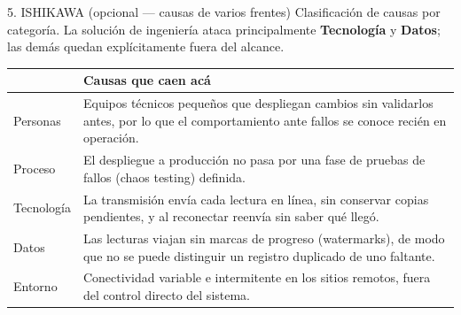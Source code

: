 \documentclass[11pt,a4paper]{article}
\newcommand{\tblhead}{\rowcolor{gris800}}
\begin{document}
\begin{seccion}{\faFish}{5. ISHIKAWA (opcional --- causas de varios frentes)}
{\small Clasificación de causas por categoría. La solución de ingeniería ataca principalmente \textbf{Tecnología} y \textbf{Datos}; las demás quedan explícitamente fuera del alcance.}
\vspace{4pt}
\renewcommand{\arraystretch}{1.35}
\begin{tabularx}{\linewidth}{>{\raggedright\arraybackslash}p{2.6cm} X}
  \toprule
  \tblhead {\color{white}\bfseries Categoría} & {\color{white}\bfseries Causas que caen acá} \\
  \midrule
  Personas & Equipos técnicos pequeños que despliegan cambios sin validarlos antes, por lo que el comportamiento ante fallos se conoce recién en operación. \\
  Proceso & El despliegue a producción no pasa por una fase de pruebas de fallos (chaos testing) definida. \\
  Tecnología & La transmisión envía cada lectura en línea, sin conservar copias pendientes, y al reconectar reenvía sin saber qué llegó. \\
  Datos & Las lecturas viajan sin marcas de progreso (watermarks), de modo que no se puede distinguir un registro duplicado de uno faltante. \\
  Entorno & Conectividad variable e intermitente en los sitios remotos, fuera del control directo del sistema. \\
  \bottomrule
\end{tabularx}
\end{seccion}
\end{document}
